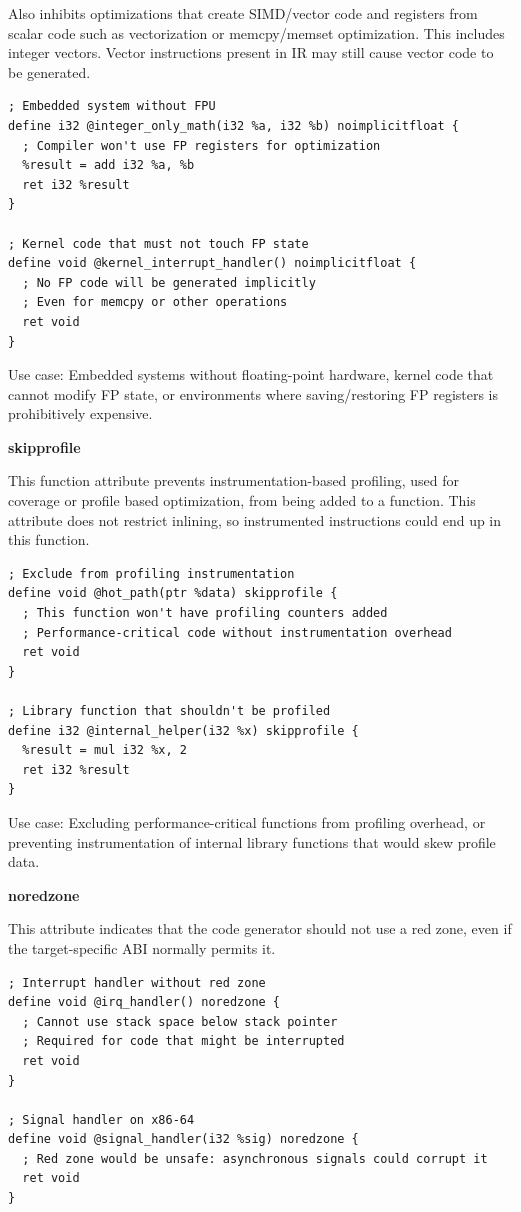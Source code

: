 Also inhibits optimizations that create SIMD/vector code and registers from scalar code such as vectorization or memcpy/memset optimization.
This includes integer vectors.
Vector instructions present in IR may still cause vector code to be generated.

\begin{lstlisting}[style=ir]
; Embedded system without FPU
define i32 @integer_only_math(i32 %a, i32 %b) noimplicitfloat {
  ; Compiler won't use FP registers for optimization
  %result = add i32 %a, %b
  ret i32 %result
}

; Kernel code that must not touch FP state
define void @kernel_interrupt_handler() noimplicitfloat {
  ; No FP code will be generated implicitly
  ; Even for memcpy or other operations
  ret void
}
\end{lstlisting}

Use case: Embedded systems without floating-point hardware, kernel code that cannot modify FP state, or environments where saving/restoring FP registers is prohibitively expensive.

\textbf{skipprofile}

This function attribute prevents instrumentation-based profiling, used for coverage or profile based optimization, from being added to a function.
This attribute does not restrict inlining, so instrumented instructions could end up in this function.

\begin{lstlisting}[style=ir]
; Exclude from profiling instrumentation
define void @hot_path(ptr %data) skipprofile {
  ; This function won't have profiling counters added
  ; Performance-critical code without instrumentation overhead
  ret void
}

; Library function that shouldn't be profiled
define i32 @internal_helper(i32 %x) skipprofile {
  %result = mul i32 %x, 2
  ret i32 %result
}
\end{lstlisting}

Use case: Excluding performance-critical functions from profiling overhead, or preventing instrumentation of internal library functions that would skew profile data.

\textbf{noredzone}

This attribute indicates that the code generator should not use a red zone, even if the target-specific ABI normally permits it.

\begin{lstlisting}[style=ir]
; Interrupt handler without red zone
define void @irq_handler() noredzone {
  ; Cannot use stack space below stack pointer
  ; Required for code that might be interrupted
  ret void
}

; Signal handler on x86-64
define void @signal_handler(i32 %sig) noredzone {
  ; Red zone would be unsafe: asynchronous signals could corrupt it
  ret void
}
\end{lstlisting}

